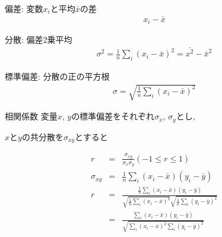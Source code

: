 \documentclass[aspectratio=169, 12pt]{beamer} %
\begin{document}
\begin{frame}{偏差: 変数$x_i$と平均$\bar{x}$の差}
    \begin{eqnarray*}
        x_i-\bar{x}
    \end{eqnarray*}
\end{frame}
\begin{frame}{分散: 偏差2乗平均}
    \begin{eqnarray*}
        \sigma^2=\frac{1}{n}\sum_i (x_i-\bar{x})^2=\bar{x^2}-\bar{x}^2
    \end{eqnarray*}
\end{frame}
\begin{frame}{標準偏差: 分散の正の平方根}
    \begin{eqnarray*}
        \sigma=\sqrt{\frac{1}{n}\sum_i (x_i-\bar{x})^2}
    \end{eqnarray*}
\end{frame}
\begin{frame}{相関係数}
    変量$x$, $y$の標準偏差をそれぞれ$\sigma_x$, $\sigma_y$とし, \par
    $x$と$y$の共分散を$\sigma_{xy}$とすると \par
    \begin{eqnarray*}
        r&=&\frac{\sigma_{xy}}{\sigma_x\sigma_y} (-1\leq r \leq 1) \\
        \sigma_{xy}&=&\frac{1}{n}\sum_i(x_i-\bar{x})(y_i-\bar{y}) \\
        r&=&\frac{\frac{1}{n}\sum_i(x_i-\bar{x})(y_i-\bar{y})}{\sqrt{\frac{1}{n}\sum_i(x_i-\bar{x})^2}\sqrt{\frac{1}{n}\sum_i(y_i-\bar{y})^2}} \\
        &=&\frac{\sum_i(x_i-\bar{x})(y_i-\bar{y})}{\sqrt{\sum_i(x_i-\bar{x})^2\sum_i(y_i-\bar{y})^2}}
    \end{eqnarray*}
\end{frame}
\end{document}
